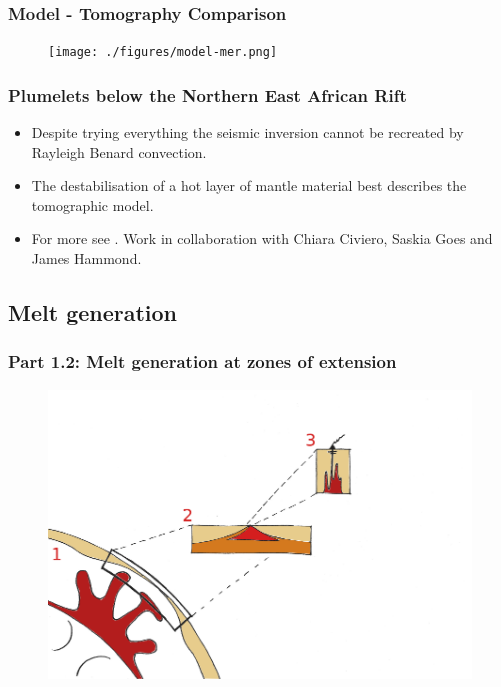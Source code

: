 \documentclass[aspectratio=169]{beamer}
\begin{document}
\begin{frame}
    \frametitle{Model - Tomography Comparison}
    \begin{figure}
        \vspace{-0.5cm}
        \texttt{[image: ./figures/model-mer.png]}
    \end{figure}
\end{frame}

\begin{frame}
    \frametitle{Plumelets below the Northern East African Rift}
    \begin{itemize}
    \item{Despite trying everything the seismic inversion cannot be recreated by Rayleigh Benard convection.}
    \item{The destabilisation of a hot layer of mantle material best describes the tomographic model.}
    \item{For more see \cite{civiero-etal-2020}. Work in collaboration with Chiara Civiero, Saskia Goes and James Hammond.}
    \end{itemize}
\end{frame}

\subsection{Melt generation}

\begin{frame}
    \frametitle{Part 1.2: Melt generation at zones of extension}
    \begin{figure}
        \includegraphics[height=0.9\paperheight]{./pictures/drawing.png}
    \end{figure}
\end{frame}
\end{document}
